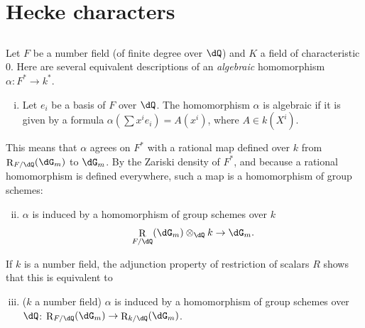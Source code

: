 \documentclass[oneside]{book}
\DeclareMathOperator{\res}{R} %
\newcounter{char}
\theoremstyle{sga-source}
\theoremstyle{sga-source-dash}
\theoremstyle{sga-source-dotdash}
\theoremstyle{sga-source-number-note-dash}
\theoremstyle{sga-source-note-number-dotdash}
\theoremstyle{sga-source-example-dotdash}
\theoremstyle{sga-source-inline-number}
\theoremstyle{sga-source-bare-number}
\theoremstyle{sga-source}
\newcommand{\PrintPage}[1]{}\newcommand{\MathPage}[1]{}\newcommand{\PrintCite}[2]{#1}\newcommand{\var}[3]{#1}
\begin{document}
\PrintPage{208}
\section{Hecke characters}\label{VI:5}





\subsection{}\label{VI:5-1}

Let $F$ be a number field (of finite degree over $\dQ$) \var{and $K$ a field}{and $k$ a field}{S45-SOL-0859} of 
characteristic $0$. Here are several equivalent descriptions of an 
\emph{algebraic} homomorphism $\alpha:F^\ast \to k^\ast$. 
\begin{enumerate}[(i)]
  \item Let $e_i$ be a basis of $F$ over $\dQ$. The homomorphism $\alpha$ is 
    algebraic if it is given by a formula 
    $\alpha(\sum x^i e_i) = A(x^i)$, where $A\in k(X^i)$. 
\end{enumerate}

This means that $\alpha$ agrees on $F^\ast$ with a rational map defined over $k$ 
from $\res_{F/\dQ}(\dG_m)$ to $\dG_m$. By the Zariski density of 
$F^\ast$, and because a rational homomorphism is defined everywhere, such 
a map is a homomorphism of group schemes: 
\begin{enumerate}[(i)]
\setcounter{enumi}{1}
  \item $\alpha$ is induced by a homomorphism of group schemes over $k$ 
    \[
      \res_{F/\dQ}(\dG_m)\otimes_\dQ k \to \dG_m \text{.} 
    \] 
\end{enumerate}

If $k$ is a number field, the adjunction property of restriction of 
scalars $R$ shows that this is equivalent to 
\begin{enumerate}[(i)]
\setcounter{enumi}{2}
  \item ($k$ a number field) $\alpha$ is induced by a homomorphism of 
    group schemes over $\dQ$: $\res_{F/\dQ}(\dG_m) \to \res_{k/\dQ}(\dG_m)$. 
\end{enumerate}
\end{document}
